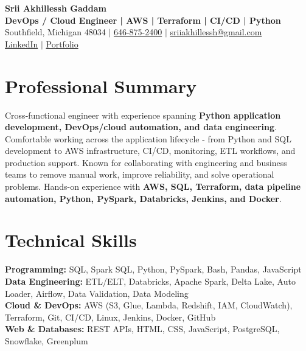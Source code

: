 \documentclass[letterpaper,10pt]{article}
\begin{document}
\fontsize{9.35pt}{10.45pt}\selectfont

\begin{center}
    {\LARGE \textbf{Srii Akhillessh Gaddam}} \\[-1pt]
    \textbf{DevOps / Cloud Engineer | AWS | Terraform | CI/CD | Python} \\[2pt]
    Southfield, Michigan 48034 $|$
    \href{tel:6468752400}{646-875-2400} $|$
    \href{mailto:sriiakhillessh@gmail.com}{sriiakhillessh@gmail.com} \\[1pt]
    \href{https://www.linkedin.com/in/srii-akhiilessh-gaddam-b48668191/}{LinkedIn} $|$
    \href{https://sriiakhillesshg.github.io/portfolio/}{Portfolio}
\end{center}
\vspace{-8pt}

\section{Professional Summary}
\small{Cross-functional engineer with experience spanning \textbf{Python application development, DevOps/cloud automation, and data engineering}. Comfortable working across the application lifecycle - from Python and SQL development to AWS infrastructure, CI/CD, monitoring, ETL workflows, and production support. Known for collaborating with engineering and business teams to remove manual work, improve reliability, and solve operational problems. Hands-on experience with \textbf{AWS, SQL, Terraform, data pipeline automation, Python, PySpark, Databricks, Jenkins, and Docker}.}

\section{Technical Skills}
\small{
\textbf{Programming:} SQL, Spark SQL, Python, PySpark, Bash, Pandas, JavaScript \\
\textbf{Data Engineering:} ETL/ELT, Databricks, Apache Spark, Delta Lake, Auto Loader, Airflow, Data Validation, Data Modeling \\
\textbf{Cloud \& DevOps:} AWS (S3, Glue, Lambda, Redshift, IAM, CloudWatch), Terraform, Git, CI/CD, Linux, Jenkins, Docker, GitHub \\
\textbf{Web \& Databases:} REST APIs, HTML, CSS, JavaScript, PostgreSQL, Snowflake, Greenplum
}
\end{document}
